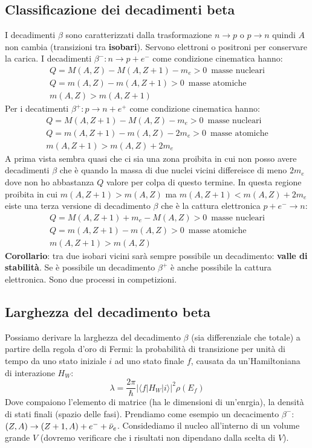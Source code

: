 \subsection{Classificazione dei decadimenti beta}
I decadimenti $\beta$ sono caratterizzati dalla trasformazione $n\to p$ o $p\to n$ quindi $A$ non cambia (transizioni tra \textbf{isobari}). Servono elettroni o positroni per conservare la carica. I decadimenti $\beta^-:n\to p+e^-$ come condizione cinematica hanno:
\begin{align*}
    Q=M(A,Z)-M(A,Z+1)-m_e>0 \,\,\,\text{masse nucleari} \\
    Q=m(A,Z)-m(A,Z+1)>0\,\,\,\text{masse atomiche} \\
    m(A,Z)>m(A,Z+1)
\end{align*}
Per i decatimenti $\beta^+:p\to n+e^+$ come condizione cinematica hanno:
\begin{align*}
    Q=M(A,Z+1)-M(A,Z)-m_e>0 \,\,\,\text{masse nucleari} \\
    Q=m(A,Z+1)-m(A,Z)-2m_e>0\,\,\,\text{masse atomiche} \\
    m(A,Z+1)>m(A,Z)+2m_e
\end{align*}
A prima vista sembra quasi che ci sia una zona proibita in cui non posso avere decadimenti $\beta$ che è quando la massa di due nuclei vicini differeisce di meno $2m_e$ dove non ho abbastanza $Q$ valore per colpa di questo termine. In questa regione proibita in cui $m(A,Z+1)>m(A,Z)$ ma $m(A,Z+1)<m(A,Z)+2m_e$ eiste una terza versione di decadimento $\beta$ che è la cattura elettronica $p+e^-\to n$:
\begin{align*}
    Q=M(A,Z+1)+m_e-M(A,Z)>0 \,\,\,\text{masse nucleari} \\
    Q=m(A,Z+1)-m(A,Z)>0\,\,\,\text{masse atomiche} \\
    m(A,Z+1)>m(A,Z)
\end{align*}
\textbf{Corollario}: tra due isobari vicini sarà sempre possibile un decadimento: \textbf{valle di stabilità}. Se è possibile un decadimento $\beta^+$ è anche possibile la cattura elettronica. Sono due processi in competizioni.
\subsection{Larghezza del decadimento beta}
Possiamo derivare la larghezza del decadimento $\beta$ (sia differenziale che totale) a partire della regola d'oro di Fermi: la probabilità di transizione per unità di tempo da uno stato iniziale $i$ ad uno stato finale $f$, causata da un'Hamiltoniana di interazione $H_W$:
\begin{equation*}
    \lambda=\frac{2\pi}{\hbar}\left|\langle f|H_W|i\rangle\right|^2\rho(E_f)
\end{equation*} 
Dove compaiono l'elemento di matrice (ha le dimensioni di un'enrgia), la densità di stati finali (spazio delle fasi). Prendiamo come esempio un decacimento $\beta^-$: $(Z,A)\to(Z+1,A)+e^-+\Bar{\nu}_e$. Considediamo il nucleo all'interno di un volume grande $V$ (dovremo verificare che i risultati non dipendano dalla scelta di $V$).
